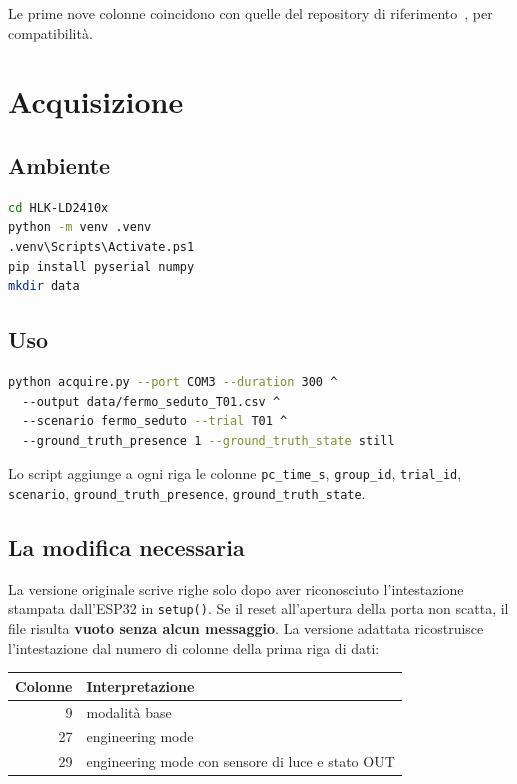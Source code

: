 Le prime nove colonne coincidono con quelle del repository di
riferimento~\cite{repoCallisto}, per compatibilità.

\section{Acquisizione}

\subsection{Ambiente}

\begin{lstlisting}[language=bash,caption={Preparazione dell'ambiente Python.},
basicstyle=\ttfamily\scriptsize]
cd HLK-LD2410x
python -m venv .venv
.venv\Scripts\Activate.ps1
pip install pyserial numpy
mkdir data
\end{lstlisting}

\subsection{Uso}

\begin{lstlisting}[language=bash,caption={Esempio di acquisizione di un trial.},
basicstyle=\ttfamily\scriptsize]
python acquire.py --port COM3 --duration 300 ^
  --output data/fermo_seduto_T01.csv ^
  --scenario fermo_seduto --trial T01 ^
  --ground_truth_presence 1 --ground_truth_state still
\end{lstlisting}

Lo script aggiunge a ogni riga le colonne \texttt{pc\_time\_s},
\texttt{group\_id}, \texttt{trial\_id}, \texttt{scenario},
\texttt{ground\_truth\_presence}, \texttt{ground\_truth\_state}.

\subsection{La modifica necessaria}

La versione originale scrive righe solo dopo aver riconosciuto l'intestazione
stampata dall'ESP32 in \texttt{setup()}. Se il reset all'apertura della porta non
scatta, il file risulta \textbf{vuoto senza alcun messaggio}. La versione adattata
ricostruisce l'intestazione dal numero di colonne della prima riga di dati:

\begin{center}\small
\begin{tabular}{@{}rl@{}}
\toprule
\textbf{Colonne} & \textbf{Interpretazione} \\
\midrule
9 & modalità base \\
27 & engineering mode \\
29 & engineering mode con sensore di luce e stato OUT \\
\bottomrule
\end{tabular}
\end{center}

